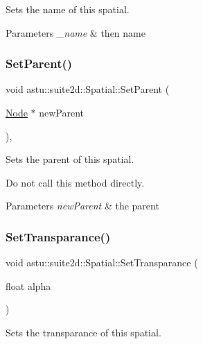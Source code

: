 Sets the name of this spatial.


\begin{DoxyParams}{Parameters}
{\em \+\_\+name} & then name \\
\hline
\end{DoxyParams}
\mbox{\label{classastu_1_1suite2d_1_1Spatial_ab3772e36188589159bc76bcbaf3dd828}} 
\subsubsection{\texorpdfstring{Set\+Parent()}{SetParent()}}
{\footnotesize\ttfamily void astu\+::suite2d\+::\+Spatial\+::\+Set\+Parent (\begin{DoxyParamCaption}\item[{\hyperlink{classastu_1_1suite2d_1_1Node}{Node} $\ast$}]{new\+Parent }\end{DoxyParamCaption})\hspace{0.3cm}{\ttfamily [inline]}, {\ttfamily [protected]}}

Sets the parent of this spatial.

Do not call this method directly.


\begin{DoxyParams}{Parameters}
{\em new\+Parent} & the parent \\
\hline
\end{DoxyParams}
\mbox{\label{classastu_1_1suite2d_1_1Spatial_a24f5b6f78fa3b70f865369b71bb15910}} 
\subsubsection{\texorpdfstring{Set\+Transparance()}{SetTransparance()}}
{\footnotesize\ttfamily void astu\+::suite2d\+::\+Spatial\+::\+Set\+Transparance (\begin{DoxyParamCaption}\item[{float}]{alpha }\end{DoxyParamCaption})}

Sets the transparance of this spatial.


